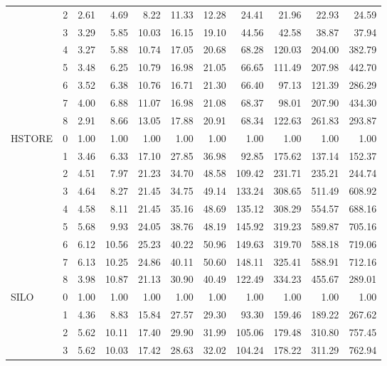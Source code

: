 \begin{tabular}{llrrrrrrrrr}
       & 2 &  2.61 &  4.69 &  8.22 & 11.33 & 12.28 &  24.41 &  21.96 &  22.93 &   24.59 \\
       & 3 &  3.29 &  5.85 & 10.03 & 16.15 & 19.10 &  44.56 &  42.58 &  38.87 &   37.94 \\
       & 4 &  3.27 &  5.88 & 10.74 & 17.05 & 20.68 &  68.28 & 120.03 & 204.00 &  382.79 \\
       & 5 &  3.48 &  6.25 & 10.79 & 16.98 & 21.05 &  66.65 & 111.49 & 207.98 &  442.70 \\
       & 6 &  3.52 &  6.38 & 10.76 & 16.71 & 21.30 &  66.40 &  97.13 & 121.39 &  286.29 \\
       & 7 &  4.00 &  6.88 & 11.07 & 16.98 & 21.08 &  68.37 &  98.01 & 207.90 &  434.30 \\
       & 8 &  2.91 &  8.66 & 13.05 & 17.88 & 20.91 &  68.34 & 122.63 & 261.83 &  293.87 \\
HSTORE & 0 &  1.00 &  1.00 &  1.00 &  1.00 &  1.00 &   1.00 &   1.00 &   1.00 &    1.00 \\
       & 1 &  3.46 &  6.33 & 17.10 & 27.85 & 36.98 &  92.85 & 175.62 & 137.14 &  152.37 \\
       & 2 &  4.51 &  7.97 & 21.23 & 34.70 & 48.58 & 109.42 & 231.71 & 235.21 &  244.74 \\
       & 3 &  4.64 &  8.27 & 21.45 & 34.75 & 49.14 & 133.24 & 308.65 & 511.49 &  608.92 \\
       & 4 &  4.58 &  8.11 & 21.45 & 35.16 & 48.69 & 135.12 & 308.29 & 554.57 &  688.16 \\
       & 5 &  5.68 &  9.93 & 24.05 & 38.76 & 48.19 & 145.92 & 319.23 & 589.87 &  705.16 \\
       & 6 &  6.12 & 10.56 & 25.23 & 40.22 & 50.96 & 149.63 & 319.70 & 588.18 &  719.06 \\
       & 7 &  6.13 & 10.25 & 24.86 & 40.11 & 50.60 & 148.11 & 325.41 & 588.91 &  712.16 \\
       & 8 &  3.98 & 10.87 & 21.13 & 30.90 & 40.49 & 122.49 & 334.23 & 455.67 &  289.01 \\
SILO & 0 &  1.00 &  1.00 &  1.00 &  1.00 &  1.00 &   1.00 &   1.00 &   1.00 &    1.00 \\
       & 1 &  4.36 &  8.83 & 15.84 & 27.57 & 29.30 &  93.30 & 159.46 & 189.22 &  267.62 \\
       & 2 &  5.62 & 10.11 & 17.40 & 29.90 & 31.99 & 105.06 & 179.48 & 310.80 &  757.45 \\
       & 3 &  5.62 & 10.03 & 17.42 & 28.63 & 32.02 & 104.24 & 178.22 & 311.29 &  762.94 \\

\end{tabular}
